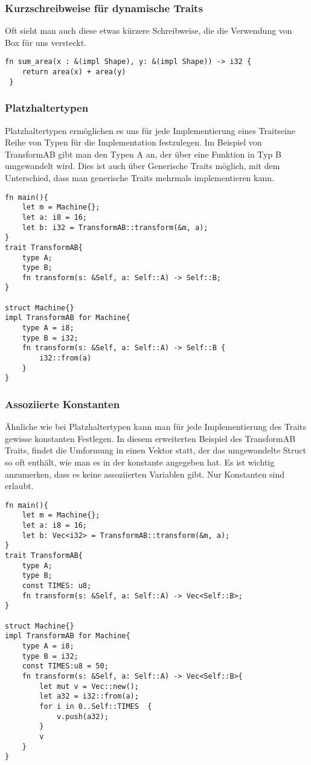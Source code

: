 \documentclass[a4paper, 1ppt]{article}
\begin{document}
\subsubsection{Kurzschreibweise für dynamische Traits}
Oft sieht man auch diese etwas kürzere Schreibweise, die die Verwendung von Box für uns versteckt.
\begin{verbatim}
fn sum_area(x : &(impl Shape), y: &(impl Shape)) -> i32 {
    return area(x) + area(y)
 }
\end{verbatim}
\subsubsection{Platzhaltertypen}
Platzhaltertypen ermöglichen es uns für jede Implementierung eines Traitseine Reihe von Typen für die Implementation festzulegen.
Im Beispiel von TransformAB gibt man den Typen A an, der über eine Funktion in Typ B umgewandelt wird. Dies ist auch über Generische Traits möglich, mit dem Unterschied, dass man generische Traits mehrmals implementieren kann. 
\begin{verbatim}
fn main(){
    let m = Machine{};
    let a: i8 = 16;
    let b: i32 = TransformAB::transform(&m, a);
}
trait TransformAB{
    type A;
    type B;
    fn transform(s: &Self, a: Self::A) -> Self::B;
}

struct Machine{}
impl TransformAB for Machine{
    type A = i8;
    type B = i32;
    fn transform(s: &Self, a: Self::A) -> Self::B {
        i32::from(a)
    }
}
\end{verbatim}
\subsubsection{Assoziierte Konstanten}
Ähnliche wie bei Platzhaltertypen kann man für jede Implementierung des Traits gewisse konstanten Festlegen. In diesem erweiterten Beispiel des TransformAB Traits, findet die Umformung in einen Vektor statt, der das umgewandelte Struct so oft enthält, wie man es in der konstante angegeben hat.
Es ist wichtig anzumerken, dass es keine assoziierten Variablen gibt. Nur Konstanten sind erlaubt.
\begin{verbatim}
fn main(){
    let m = Machine{};
    let a: i8 = 16;
    let b: Vec<i32> = TransformAB::transform(&m, a);
}
trait TransformAB{
    type A;
    type B;
    const TIMES: u8;
    fn transform(s: &Self, a: Self::A) -> Vec<Self::B>;
}

struct Machine{}
impl TransformAB for Machine{
    type A = i8;
    type B = i32;
    const TIMES:u8 = 50;
    fn transform(s: &Self, a: Self::A) -> Vec<Self::B>{
        let mut v = Vec::new();
        let a32 = i32::from(a);
        for i in 0..Self::TIMES  {
            v.push(a32);
        }
        v
    }
}
\end{verbatim}
\end{document}
